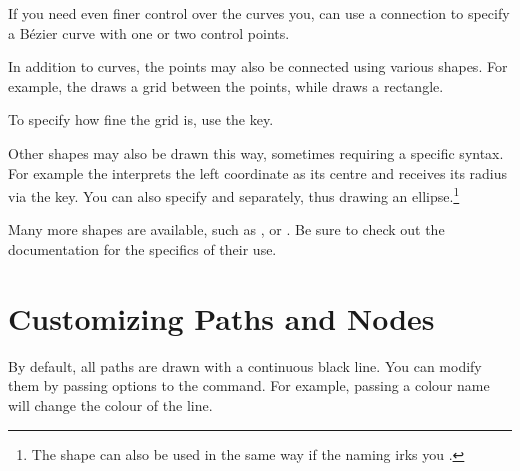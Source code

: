 If you need even finer control over the curves you, can use a
 connection to specify a Bézier curve with one
or two control points.
\begin{chktexignore}
\begin{example}[vertical_mode, examplewidth=0.8\linewidth]
\vspace{-0.5cm} %
\end{example}
\end{chktexignore}

In addition to curves, the points may also be connected using various shapes.
For example, the  draws a grid between the points, while
 draws a rectangle.
\begin{example}[vertical_mode, examplewidth=0.8\linewidth]
\end{example}
To specify how fine the grid is, use the  key.
\begin{example}[vertical_mode, examplewidth=0.8\linewidth]
\end{example}

Other shapes may also be drawn this way, sometimes requiring a specific syntax.
For example the  interprets the left coordinate as its centre and
receives its radius via the  key. You can also specify  and  separately, thus drawing an ellipse.\footnote{The
   shape can also be used in the same way if the naming irks you
  \smiley.}
\begin{example}[vertical_mode, examplewidth=0.9\linewidth]
\end{example}
Many more shapes are available, such as ,  or .
Be sure to check out the documentation\cite{pack:pgf} for the specifics of their use.

\section{Customizing Paths and Nodes}

By default, all paths are drawn with a continuous black line. You can modify
them by passing options to the  command. For example, passing
a colour name will change the colour of the line.
\begin{example}
\end{example}

